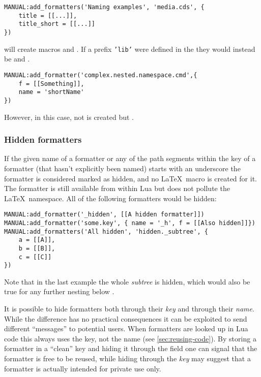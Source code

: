 \documentclass[12pt]{scrartcl}
\begin{document}
\begin{verbatim}
MANUAL:add_formatters('Naming examples', 'media.cds', {
	title = [[...]],
	title_short = [[...]]
})
\end{verbatim}

\noindent will create macros  and .
If a prefix \texttt{'lib'} were defined in the  they would
instead be  and .

\begin{verbatim}
MANUAL:add_formatter('complex.nested.namespace.cmd',{
	f = [[Something]],
	name = 'shortName'
})
\end{verbatim}

\noindent However, in this case, not  is created but .


\subsubsection{Hidden formatters}
\label{sec:usage:hidden-formatters}

If the given name of a formatter or any of the path segments within the key
of a formatter (that hasn't explicitly been named) starts with an underscore the
formatter is considered marked as hidden, and no \LaTeX\ macro is created for
it.  The formatter is still available from within Lua but does not pollute the
\LaTeX\ namespace.  All of the following formatters would be hidden:

\begin{verbatim}
MANUAL:add_formatter('_hidden', [[A hidden formatter]])
MANUAL:add_formatter('some.key', { name = '_h', f = [[Also hidden]]})
MANUAL:add_formatters('All hidden', 'hidden._subtree', {
	a = [[A]],
	b = [[B]],
	c = [[C]]
})
\end{verbatim}

\noindent Note that in the last example the whole \emph{subtree} is hidden,
which would also be true for any further nesting below
.

It is possible to hide formatters both through their \emph{key} and through
their \emph{name}.  While the difference has no practical consequences it can be
exploited to send different “messages” to potential users.  When formatters are
looked up in Lua code this always uses the key, not the name (see
\vref{sec:reusing-code}).  By storing a formatter in a “clean” key and hiding it
through the  field one can signal that the formatter is free to be
reused, while hiding through the \emph{key} may suggest that a formatter is
actually intended for private use only.
\end{document}
